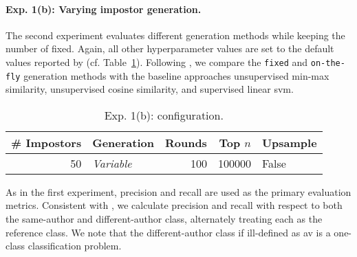 \paragraph{Exp. 1(b): Varying impostor generation.}
The second experiment evaluates different \imp{} generation methods while keeping the number of \imps{} fixed.
Again, all other hyperparameter values are set to the default values reported by \citet{koppel_determining_2014} (cf. Table~\ref{tab:repr_exp2}). 
Following \citet{koppel_determining_2014}, we compare the \texttt{fixed} and \texttt{on-the-fly} \imp{} generation methods with the baseline approaches unsupervised min-max similarity, unsupervised cosine similarity, and supervised linear \ac{svm}.

\begin{table}[h]
\centering\small
\caption{Exp. 1(b): \impAppr{} configuration.}
\label{tab:repr_exp2}
\begin{tabular}{@{}rlrrl@{}}   %
\toprule
\# Impostors & Generation & Rounds & Top $n$ & Upsample \\
\midrule
50 & \textit{Variable} & 100 & \num{100000} & False \\
\bottomrule
\end{tabular}%
\end{table}

As in the first experiment, precision and recall are used as the primary evaluation metrics. 
Consistent with \citet{koppel_determining_2014}, we calculate precision and recall with respect to both the same-author and different-author class, alternately treating each as the reference class.
We note that the different-author class if ill-defined as \ac{av} is a one-class classification problem.
